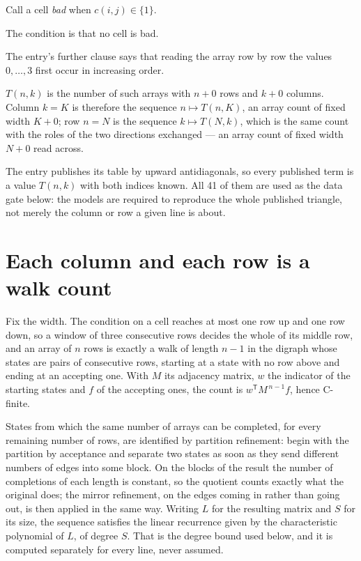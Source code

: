 \documentclass[11pt]{article}
\theoremstyle{definition}
\begin{document}
Call a cell {\itshape bad} when $c(i,j) \in \{1\}$.

The condition is that no cell is bad.

The entry's further clause says that reading the array row by row the values $0,\dots,3$ first occur in increasing order.

$T(n,k)$ is the number of such arrays with $n + 0$ rows and $k + 0$ columns. Column $k = K$ is therefore the sequence $n \mapsto T(n,K)$, an array count of fixed width $K + 0$; row $n = N$ is the sequence $k \mapsto T(N,k)$, which is the same count with the roles of the two directions exchanged --- an array count of fixed width $N + 0$ read across.

The entry publishes its table by upward antidiagonals, so every published term is a value $T(n,k)$ with both indices known. All 41 of them are used as the data gate below: the models are required to reproduce the whole published triangle, not merely the column or row a given line is about.

\section{Each column and each row is a walk count}

Fix the width. The condition on a cell reaches at most one row up and one row down, so a window of three consecutive rows decides the whole of its middle row, and an array of $n$ rows is exactly a walk of length $n-1$ in the digraph whose states are pairs of consecutive rows, starting at a state with no row above and ending at an accepting one. With $M$ its adjacency matrix, $w$ the indicator of the starting states and $f$ of the accepting ones, the count is $w^{\mathsf T}M^{\,n-1}f$, hence C-finite.

States from which the same number of arrays can be completed, for every remaining number of rows, are identified by partition refinement: begin with the partition by acceptance and separate two states as soon as they send different numbers of edges into some block. On the blocks of the result the number of completions of each length is constant, so the quotient counts exactly what the original does; the mirror refinement, on the edges coming in rather than going out, is then applied in the same way. Writing $L$ for the resulting matrix and $S$ for its size, the sequence satisfies the linear recurrence given by the characteristic polynomial of $L$, of degree $S$. That is the degree bound used below, and it is computed separately for every line, never assumed.
\end{document}
